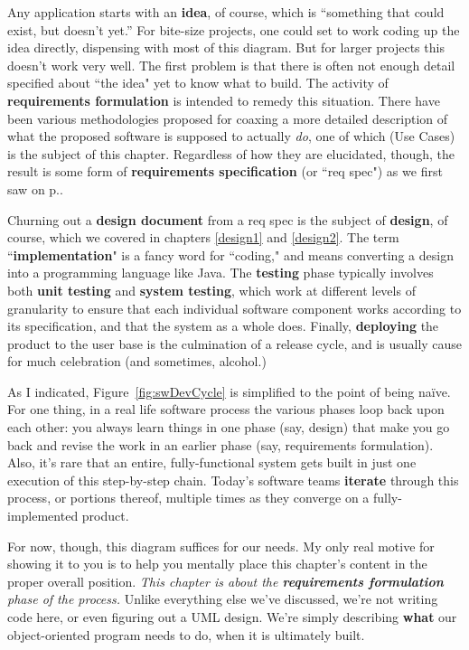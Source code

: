 Any application starts with an \textbf{idea}, of course, which is ``something
that could exist, but doesn't yet.'' For bite-size projects, one could set to
work coding up the idea directly, dispensing with most of this diagram. But
for larger projects this doesn't work very well. The first problem is that
there is often not enough detail specified about ``the idea" yet to know what
to build. The activity of \textbf{requirements formulation} is intended to
remedy this situation. There have been various methodologies proposed for
coaxing a more detailed description of what the proposed software is supposed
to actually \textit{do}, one of which (Use Cases) is the subject of this
chapter. Regardless of how they are elucidated, though, the result is some
form of \textbf{requirements specification} (or ``req spec") as we first saw
on p.\pageref{reqSpec}.

Churning out a \textbf{design document} from a req spec is the subject of
\textbf{design}, of course, which we covered in chapters \ref{design1} and
\ref{design2}. The term ``\textbf{implementation}" is a fancy word for
``coding," and means converting a design into a programming language like
Java. The \textbf{testing} phase typically involves both \textbf{unit testing}
and \textbf{system testing}, which work at different levels of granularity to
ensure that each individual software component works according to its
specification, and that the system as a whole does. Finally,
\textbf{deploying} the product to the user base is the culmination of a
release cycle, and is usually cause for much celebration (and sometimes,
alcohol.)

As I indicated, Figure~\ref{fig:swDevCycle} is simplified to the point of
being na\"{i}ve. For one thing, in a real life software process the various
phases loop back upon each other: you always learn things in one phase (say,
design) that make you go back and revise the work in an earlier phase (say,
requirements formulation). Also, it's rare that an entire, fully-functional
system gets built in just one execution of this step-by-step chain. Today's
software teams \textbf{iterate} through this process, or portions thereof,
multiple times as they converge on a fully-implemented product. 

For now, though, this diagram suffices for our needs. My only real motive for
showing it to you is to help you mentally place this chapter's content in the
proper overall position. \textit{This chapter is about the
\textbf{requirements formulation} phase of the process.} Unlike everything
else we've discussed, we're not writing code here, or even figuring out a UML
design. We're simply describing \textbf{what} our object-oriented program
needs to do, when it is ultimately built.


